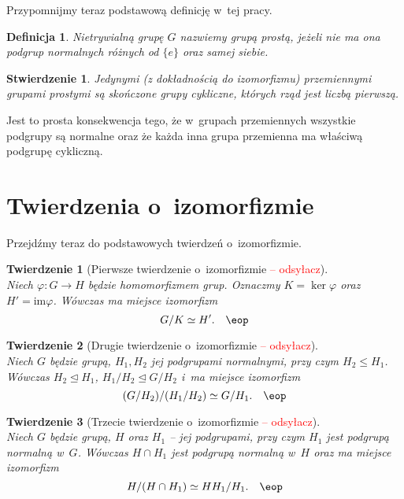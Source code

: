\documentclass[licencjacka]{pracamgr}
\newtheorem{deff}{Definicja}[section]
\newtheorem{thh}{Twierdzenie}[section]
\newtheorem{fact}{Stwierdzenie}[section]
\begin{document}
Przypomnijmy teraz podstawową definicję w~tej pracy.
\begin{deff}
    Nietrywialną grupę $G$ nazwiemy \emph{grupą prostą}, jeżeli nie ma ona podgrup normalnych różnych od $\{e\}$ oraz samej siebie.
\end{deff}
\begin{fact}
    Jedynymi (z dokładnością do izomorfizmu) przemiennymi grupami prostymi są skończone grupy cykliczne,
    których rząd jest liczbą pierwszą.
\end{fact}
Jest to prosta konsekwencja tego, że w~grupach przemiennych
wszystkie podgrupy są normalne oraz że każda inna grupa przemienna ma właściwą podgrupę cykliczną.


\section{Twierdzenia o~izomorfizmie}
Przejdźmy teraz do podstawowych twierdzeń o~izomorfizmie.
\begin{thh}[Pierwsze twierdzenie o~izomorfizmie \textcolor{red}{ -- odsyłacz}] $ $ \\
    Niech $ \varphi \colon G \to H$ będzie homomorfizmem grup. Oznaczmy $K = \ker{\varphi}$ oraz
    $H' = \mathrm{im}\varphi $. 
    Wówczas ma miejsce izomorfizm $$G/K \simeq H'.\quad\eop$$
\end{thh}
\begin{thh}[Drugie twierdzenie o~izomorfizmie \textcolor{red}{ -- odsyłacz}]$ $\\
    Niech $G$ będzie grupą,  $H_1, H_2$ jej podgrupami normalnymi,
    przy czym $H_2 \leq H_1$. 
    Wówczas $H_2 \trianglelefteq H_1$, $H_1/H_2 \trianglelefteq G/H_2$ i~ma miejsce izomorfizm
    $$ (G/H_2) / (H_1/H_2) \simeq G/H_1.\quad\eop$$
\end{thh}
\begin{thh}[Trzecie twierdzenie o~izomorfizmie \textcolor{red}{ -- odsyłacz}] $ $ \\
    Niech $G$ będzie grupą, $H$ oraz $H_1$
    -- jej podgrupami, przy czym $H_1$ jest podgrupą normalną w~$G$. 
    Wówczas $H\cap H_1$ jest podgrupą normalną w~$H$ oraz ma miejsce izomorfizm
    $$ H/(H\cap H_1) \simeq HH_1 / H_1.\quad\eop$$
\end{thh}
\end{document}
